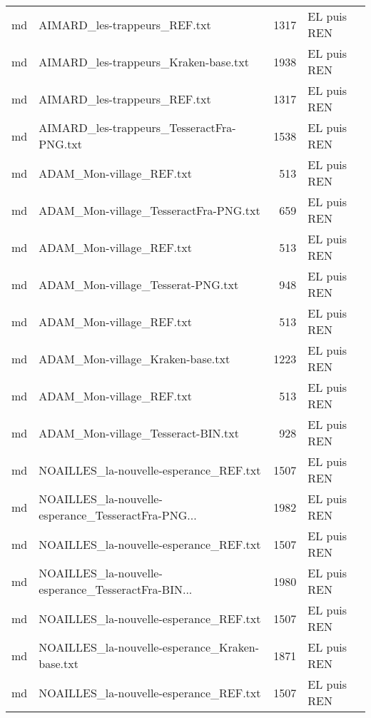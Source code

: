 \begin{tabular}{llrl}
    md &                       AIMARD\_les-trappeurs\_REF.txt &                  1317 & EL puis REN \\
    md &               AIMARD\_les-trappeurs\_Kraken-base.txt &                  1938 & EL puis REN \\
    md &                       AIMARD\_les-trappeurs\_REF.txt &                  1317 & EL puis REN \\
    md &          AIMARD\_les-trappeurs\_TesseractFra-PNG.txt &                  1538 & EL puis REN \\
    md &                           ADAM\_Mon-village\_REF.txt &                   513 & EL puis REN \\
    md &              ADAM\_Mon-village\_TesseractFra-PNG.txt &                   659 & EL puis REN \\
    md &                           ADAM\_Mon-village\_REF.txt &                   513 & EL puis REN \\
    md &                  ADAM\_Mon-village\_Tesserat-PNG.txt &                   948 & EL puis REN \\
    md &                           ADAM\_Mon-village\_REF.txt &                   513 & EL puis REN \\
    md &                   ADAM\_Mon-village\_Kraken-base.txt &                  1223 & EL puis REN \\
    md &                           ADAM\_Mon-village\_REF.txt &                   513 & EL puis REN \\
    md &                 ADAM\_Mon-village\_Tesseract-BIN.txt &                   928 & EL puis REN \\
    md &             NOAILLES\_la-nouvelle-esperance\_REF.txt &                  1507 & EL puis REN \\
    md & NOAILLES\_la-nouvelle-esperance\_TesseractFra-PNG... &                  1982 & EL puis REN \\
    md &             NOAILLES\_la-nouvelle-esperance\_REF.txt &                  1507 & EL puis REN \\
    md & NOAILLES\_la-nouvelle-esperance\_TesseractFra-BIN... &                  1980 & EL puis REN \\
    md &             NOAILLES\_la-nouvelle-esperance\_REF.txt &                  1507 & EL puis REN \\
    md &     NOAILLES\_la-nouvelle-esperance\_Kraken-base.txt &                  1871 & EL puis REN \\
    md &             NOAILLES\_la-nouvelle-esperance\_REF.txt &                  1507 & EL puis REN \\

\end{tabular}
